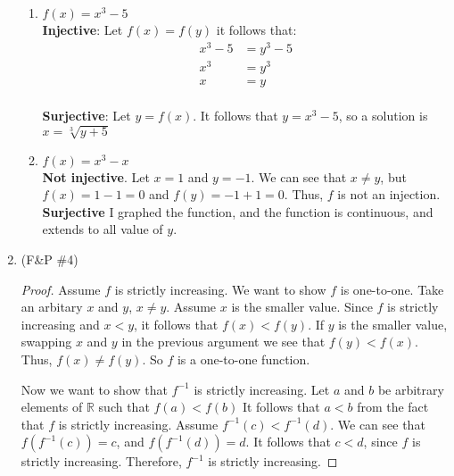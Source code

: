 \documentclass{article}
\theoremstyle{problem}
\theoremstyle{plain}
\theoremstyle{remark}
\begin{document}
\begin{enumerate}
\begin{enumerate}
    \item $f(x) = x^3 - 5$\\
      \textbf{Injective}: Let $f(x) = f(y)$ it follows that:
      \begin{align*}
        x^3 - 5 &= y^3 - 5\\
        x^3 &= y^3\\
        x &= y
      \end{align*}\\
      \textbf{Surjective}: Let $y = f(x)$. It follows that $y = x^3 - 5$, so a solution is $x = \displaystyle \sqrt[3]{y + 5}$

    \item $f(x) = x^3 - x$\\
      \textbf{Not injective}. Let $x = 1$ and $y = -1$. We can see that $x \not = y$, but $f(x) = 1 - 1 = 0$ and $f(y) = -1 + 1 = 0$. Thus, $f$ is not an injection.\\
      \textbf{Surjective} I graphed the function, and the function is continuous, and extends to all value of $y$.
    \end{enumerate}

    \item (F\&P {\small \#}4)\\[-.7cm]
      \begin{proof}
        Assume $f$ is strictly increasing. 
        We want to show $f$ is one-to-one. 
        Take an arbitary $x$ and $y$, $x \not = y$. 
        Assume $x$ is the smaller value.
        Since $f$ is strictly increasing and $x < y$, it follows that $f(x) < f(y)$.
        If $y$ is the smaller value, 
        swapping $x$ and $y$ in the previous argument we see that $f(y) < f(x)$.
        Thus, $f(x) \not = f(y)$. 
        So $f$ is a one-to-one function. 

        Now we want to show that $f^{-1}$ is strictly increasing. 
        Let $a$ and $b$ be arbitrary elements of $\mathbb{R}$ such that $f(a) < f(b)$
        It follows that $a < b$ from the fact that $f$ is strictly increasing.
        Assume $f^{-1}(c) < f^{-1}(d)$.
        We can see that $f(f^{-1}(c)) = c$, and $f(f^{-1}(d)) = d$.
        It follows that $c < d$, since $f$ is strictly increasing.
        Therefore, $f^{-1}$ is strictly increasing.
      \end{proof}


\end{enumerate}
\end{document}
